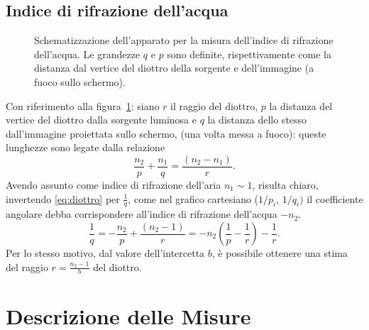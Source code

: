 \documentclass{article}[a4paper,11pt]
\begin{document}
\subsection*{Indice di rifrazione dell'acqua}
\begin{figure}[!htb]\centering
 \caption{Schematizzazione dell'apparato per la misura dell'indice di
    rifrazione dell'acqua. Le grandezze $q$ e $p$ sono definite,
    rispettivamente come la distanza dal vertice del diottro della
    sorgente e dell'immagine (a fuoco sullo schermo).}
\label{fig:acqua}
\end{figure}
\noindent
Con riferimento alla figura~\ref{fig:acqua}: siano $r$ il raggio del diottro, $p$ la distanza del vertice del diottro dalla sorgente luminosa e $q$ la distanza dello stesso dall'immagine proiettata sullo schermo, (una volta messa a fuoco): queste lunghezze sono legate dalla relazione
\begin{equation}\label{eq:diottro}
  \frac{n_2}{p} + \frac{n_1}{q} = \frac{(n_2 - n_1)}{r}.
\end{equation}
\noindent
Avendo assunto come indice di rifrazione dell'aria $n_1 \sim 1$, risulta chiaro, invertendo \eqref{eq:diottro} per $\frac{1}{q}$, come nel grafico cartesiano ($1/p_i$, $1/q_i)$ il coefficiente angolare debba corrispondere all'indice di rifrazione dell'acqua $-n_2$. 
\begin{equation}\label{eq:fit_w}
  \frac{1}{q} = -\frac{n_2}{p} + \frac{(n_2 - 1)}{r} = -n_2 \left(\frac{1}{p} - \frac{1}{r}\right) - \frac{1}{r}.
\end{equation}
Per lo stesso motivo, dal valore dell'intercetta $b$, è possibile ottenere una stima del raggio $r =\frac{n_2 - 1}{b}$ del diottro.

\section{Descrizione delle Misure}
\end{document}
